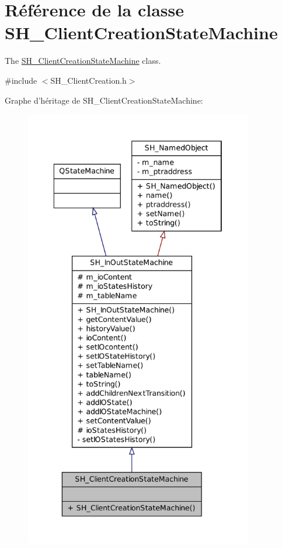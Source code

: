 \hypertarget{classSH__ClientCreationStateMachine}{\section{Référence de la classe S\-H\-\_\-\-Client\-Creation\-State\-Machine}
\label{classSH__ClientCreationStateMachine}
}


The \hyperlink{classSH__ClientCreationStateMachine}{S\-H\-\_\-\-Client\-Creation\-State\-Machine} class.  




{\ttfamily \#include $<$S\-H\-\_\-\-Client\-Creation.\-h$>$}



Graphe d'héritage de S\-H\-\_\-\-Client\-Creation\-State\-Machine\-:\nopagebreak
\begin{figure}[H]
\begin{center}
\leavevmode
\includegraphics[height=550pt]{classSH__ClientCreationStateMachine__inherit__graph}
\end{center}
\end{figure}


